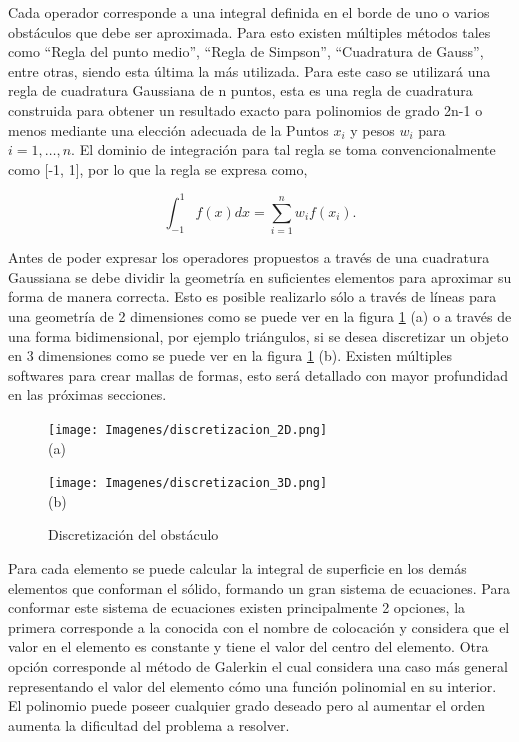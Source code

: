 \documentclass[12pt,letterpaper]{article}
\numberwithin{equation}{section}
\begin{document}
Cada operador corresponde a una integral definida en el borde de uno o varios obstáculos que debe ser aproximada. Para esto existen múltiples métodos tales como ``Regla del punto medio'', ``Regla de Simpson'', ``Cuadratura de Gauss'', entre otras, siendo esta última la más utilizada. Para este caso se utilizará una regla de cuadratura Gaussiana de n puntos, esta es una regla de cuadratura construida para obtener un resultado exacto para polinomios de grado 2n-1 o menos mediante una elección adecuada de la Puntos $x_i$ y pesos $w_i$ para $i = 1, \ldots, n$. El dominio de integración para tal regla se toma convencionalmente como [-1, 1], por lo que la regla se expresa como,

$$\int_{-1}^{1}f(x)dx = \sum_{i=1}^{n}w_if(x_i).$$

Antes de poder expresar los operadores propuestos a través de una cuadratura Gaussiana se debe dividir la geometría en suficientes elementos para aproximar su forma de manera correcta. Esto es posible realizarlo sólo a través de líneas para una geometría de 2 dimensiones como se puede ver en la figura \ref{fig:discretizacion_omega} (a) o a través de una forma bidimensional, por ejemplo triángulos, si se desea discretizar un objeto en 3 dimensiones como se puede ver en la figura \ref{fig:discretizacion_omega} (b). Existen múltiples softwares para crear mallas de formas, esto será detallado con mayor profundidad en las próximas secciones.

\begin{figure}[H]
	\begin{minipage}{0.5\linewidth}
	\centering\texttt{[image: Imagenes/discretizacion\_2D.png]}\\
		\centering(a)
	\end{minipage}
	\begin{minipage}{0.5\linewidth}
	\centering\texttt{[image: Imagenes/discretizacion\_3D.png]}\\
		\centering(b)
	\end{minipage}
	\caption{Discretización del obstáculo}
	\label{fig:discretizacion_omega}
\end{figure}

Para cada elemento se puede calcular la integral de superficie en los demás elementos que conforman el sólido, formando un gran sistema de ecuaciones. Para conformar este sistema de ecuaciones existen principalmente 2 opciones, la primera corresponde a la conocida con el nombre de colocación y considera que el valor en el elemento es constante y tiene el valor del centro del elemento. Otra opción corresponde al método de Galerkin el cual considera una caso más general representando el valor del elemento cómo una función polinomial en su interior. El polinomio puede poseer cualquier grado deseado pero al aumentar el orden aumenta la dificultad del problema a resolver.
\end{document}
